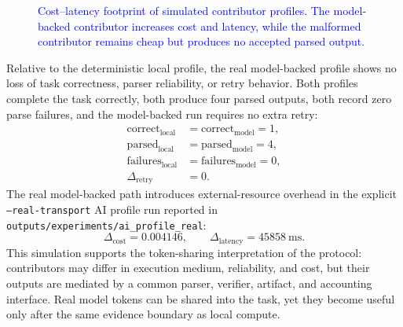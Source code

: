\documentclass{article}
\theoremstyle{plain}
\begin{document}
\begin{figure}[!htbp]
{{
}
}
\caption{\textcolor{blue}{Cost--latency footprint of simulated contributor profiles. The model-backed contributor increases cost and latency, while the malformed contributor remains cheap but produces no accepted parsed output.}}
\label{fig:cost-latency-footprint}
\end{figure}

Relative to the deterministic local profile, the real model-backed profile shows
no loss of task correctness, parser reliability, or retry behavior. Both profiles
complete the task correctly, both produce four parsed outputs, both record zero
parse failures, and the model-backed run requires no extra retry:
\[
  \begin{aligned}
    \mathrm{correct}_{\text{local}} &= \mathrm{correct}_{\text{model}} = 1,\\
    \mathrm{parsed}_{\text{local}} &= \mathrm{parsed}_{\text{model}} = 4,\\
    \mathrm{failures}_{\text{local}} &= \mathrm{failures}_{\text{model}} = 0,\\
    \Delta_{\mathrm{retry}} &= 0.
  \end{aligned}
\]
The real model-backed path introduces external-resource overhead in the explicit
\texttt{--real-transport} AI profile run reported in
\texttt{outputs/experiments/ai\_profile\_real}:
\[
  \Delta_{\mathrm{cost}}=0.004146,\qquad
  \Delta_{\mathrm{latency}}=45858\ \mathrm{ms}.
\]
{\color{blue}
This simulation supports the token-sharing interpretation of the protocol: contributors may differ in execution medium, reliability, and cost, but their outputs are mediated by a common parser, verifier, artifact, and accounting interface. Real model tokens can be shared into the task, yet they become useful only after the same evidence boundary as local compute.
}
\end{document}
